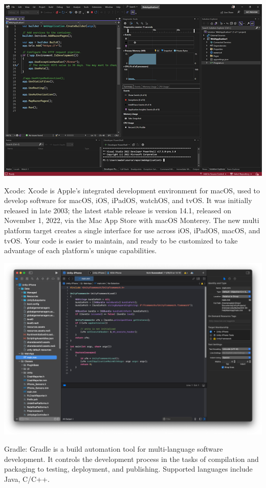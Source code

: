 \documentclass[12pt]{report}
\begin{document}
\includegraphics[scale=0.6]{image7.png}

Xcode: Xcode is Apple's integrated development environment for macOS, used to develop software for macOS, iOS, iPadOS, watchOS, and tvOS. It was initially released in late 2003; the latest stable release is version 14.1, released on November 1, 2022, via the Mac App Store with macOS Monterey. The new multi platform target creates a single interface for use across iOS, iPadOS, macOS, and tvOS. Your code is easier to maintain, and ready to be customized to take advantage of each platform’s unique capabilities.

\includegraphics[scale=0.2]{image8.png}

Gradle: Gradle is a build automation tool for multi-language software development. It controls the development process in the tasks of compilation and packaging to testing, deployment, and publishing. Supported languages include Java, C/C++.
\end{document}
